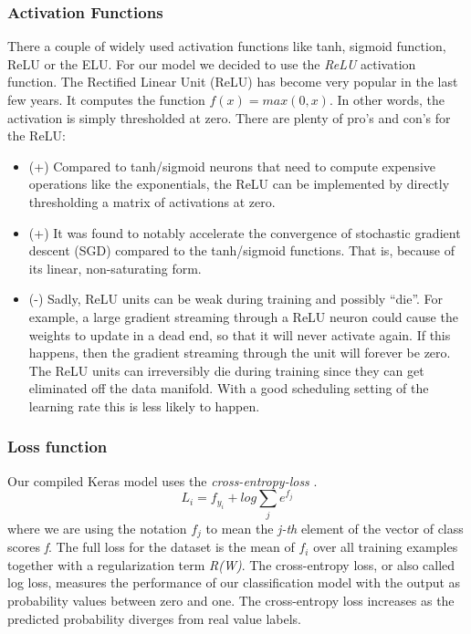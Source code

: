 \documentclass[journal]{IEEEtran}
\begin{document}
\subsubsection{Activation Functions}
\label{sec:activationFunctions}
\noindent There a couple of widely used activation functions like tanh, sigmoid function, ReLU or the ELU. For our model we decided to use the \textit{ReLU} activation function. The Rectified Linear Unit (ReLU) has become very popular in the last few years. It computes the function \(f(x)=max(0,x)\). In other words, the activation is simply thresholded at zero. There are plenty of pro's and con's for the ReLU:
\begin{itemize}
\item (+) Compared to tanh/sigmoid neurons that need to compute expensive operations  like the exponentials, the ReLU can be implemented by directly thresholding a matrix of activations at zero.
\item (+) It was found to notably accelerate the convergence of stochastic gradient descent (SGD) compared to the tanh/sigmoid functions. That is, because of its linear, non-saturating form.
\item (-) Sadly, ReLU units can be weak during training and possibly “die”. For example, a large gradient streaming through a ReLU neuron could cause the weights to update in a dead end, so that it will never activate again. If this happens, then the gradient streaming through the unit will forever be zero. The ReLU units can irreversibly die during training since they can get eliminated off the data manifold. With a good scheduling setting of the learning rate this is less likely to happen. \\
\end{itemize}
\subsubsection{Loss function}
\noindent Our compiled Keras model uses the \textit{cross-entropy-loss} \cite{RN3}. 
\begin{equation}
L_{i} = f_{y_{i}} + log \sum_{j} e^{f_{j}}
\end{equation}
where we are using the notation \(f_{j}\) to mean the \textit{j-th} element of the vector of class scores \textit{f}. The full loss for the dataset is the mean of \(f_{i}\) over all training examples together with a regularization term \textit{R(W)}.
The cross-entropy loss, or also called log loss, measures the performance of our classification model with the output as probability values between zero and one. The cross-entropy loss increases as the predicted probability diverges from real value labels.
\end{document}
